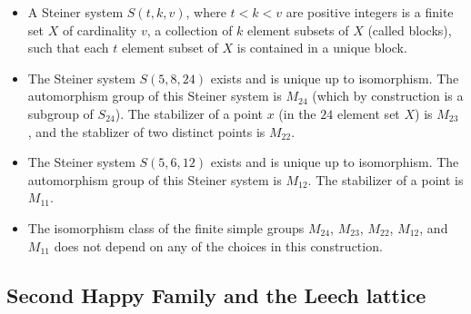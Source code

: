 \begin{itemize}
\item A Steiner system $S(t,k,v)$, where $t < k < v$ are positive
  integers is a finite set $X$ of cardinality $v$, a collection of $k$
  element subsets of $X$ (called blocks), such that each $t$ element
  subset of $X$ is contained in a unique block. \label{itm:steiner-system-def}
\item The Steiner system $S(5,8,24)$ \label{itm:steiner-system-5-8-24} exists and is unique up to
  isomorphism.  The automorphism group of this Steiner system is
  $M_{24}$ \label{mathieu-group-M24}(which by construction is a subgroup of $S_{24}$).  The
  stabilizer of a point $x$ (in the $24$ element set $X$) is $M_{23}$ \label{mathieu-group-M23},
  and the stablizer of two distinct points is $M_{22}$.\label{mathieu-group-M22}
\item The Steiner system $S(5,6,12)$ exists and is unique up to
  isomorphism.  The automorphism group of this Steiner system is
  $M_{12}$.  The stabilizer of a point is $M_{11}$. \label{itm:steiner-system-5-6-12}
\item The isomorphism class of the finite simple groups $M_{24}$,
  $M_{23}$, $M_{22}$, $M_{12}$, and $M_{11}$ does not depend on any of
  the choices in this construction. 
\end{itemize}

\subsection{Second Happy Family and the Leech lattice} \label{sec:second-happy-family}

